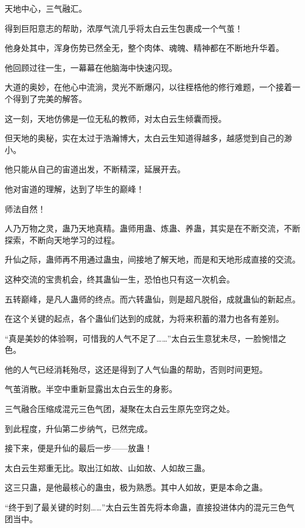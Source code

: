 
\begin{this_body}



天地中心，三气融汇。

得到巨阳意志的帮助，浓厚气流几乎将太白云生包裹成一个气茧！

他身处其中，浑身伤势已然全无，整个肉体、魂魄、精神都在不断地升华着。

他回顾过往一生，一幕幕在他脑海中快速闪现。

大道的奥妙，在他心中流淌，灵光不断爆闪，以往桎梏他的修行难题，一个接着一个得到了完美的解答。

这一刻，天地仿佛是一位无私的教师，对太白云生倾囊而授。

但天地的奥秘，实在太过于浩瀚博大，太白云生知道得越多，越感觉到自己的渺小。

他只能从自己的宙道出发，不断精深，延展开去。

他对宙道的理解，达到了毕生的巅峰！

师法自然！

人乃万物之灵，蛊乃天地真精。蛊师用蛊、炼蛊、养蛊，其实是在不断交流，不断探索，不断向天地学习的过程。

升仙之际，蛊师再不用通过蛊虫，间接地了解天地，而是和天地形成直接的交流。

这种交流的宝贵机会，终其蛊仙一生，恐怕也只有这一次机会。

五转巅峰，是凡人蛊师的终点。而六转蛊仙，则是超凡脱俗，成就蛊仙的新起点。

在这个关键的起点，各个蛊仙们达到的成就，为将来积蓄的潜力也各有差别。

“真是美妙的体验啊，可惜我的人气不足了……”太白云生意犹未尽，一脸惋惜之色。

他的人气已经消耗殆尽，这还是得到了人气仙蛊的帮助，否则时间更短。

气茧消散。半空中重新显露出太白云生的身影。

三气融合压缩成混元三色气团，凝聚在太白云生原先空窍之处。

到此程度，升仙第二步纳气，已然完成。

接下来，便是升仙的最后一步——放蛊！

太白云生郑重无比。取出江如故、山如故、人如故三蛊。

这三只蛊，是他最核心的蛊虫，极为熟悉。其中人如故，更是本命之蛊。

“终于到了最关键的时刻……”太白云生首先将本命蛊，直接投进体内的混元三色气团当中。


\end{this_body}
